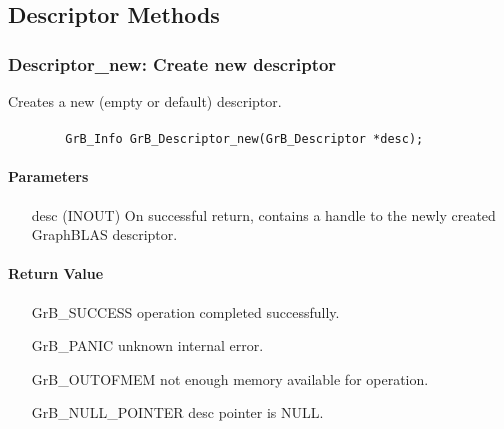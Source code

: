 \subsection{Descriptor Methods}

\subsubsection{{\sf Descriptor\_new}: Create new descriptor}

Creates a new (empty or default) descriptor.

\paragraph{\syntax}

\begin{verbatim}
        GrB_Info GrB_Descriptor_new(GrB_Descriptor *desc);
\end{verbatim}

\paragraph{Parameters}

\begin{itemize}[leftmargin=1.1in]
    \item[{\sf desc}] ({\sf INOUT}) On successful return, contains a 
    handle to the newly created GraphBLAS descriptor.
\end{itemize}

\paragraph{Return Value}

\begin{itemize}[leftmargin=2.1in]
\item[{\sf GrB\_SUCCESS}]           operation completed successfully.
\item[{\sf GrB\_PANIC}]             unknown internal error.
\item[{\sf GrB\_OUTOFMEM}]          not enough memory available for operation.
\item[{\sf GrB\_NULL\_POINTER}]    {\sf desc} pointer is {\sf NULL}.
\end{itemize}

